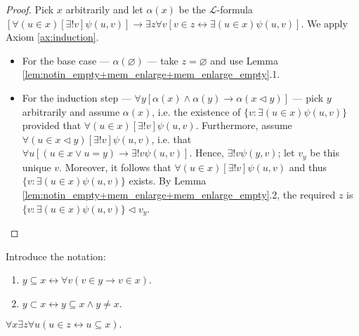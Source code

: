 \begin{proof}
    \leanok
    Pick $x$ arbitrarily and let $\alpha (x)$ be the $\mathcal{L}$-formula 
    $[\forall (u \in x) [\exists! v] \psi (u,v)]\rightarrow 
    \exists z \forall v [v\in z \leftrightarrow \exists(u \in x) \psi (u,v)]$.
    We apply Axiom \ref{ax:induction}.
    \begin{itemize}
        \item For the base case — $\alpha (\varnothing)$ — take $z=\varnothing$ and use 
        Lemma \ref{lem:notin_empty+mem_enlarge+mem_enlarge_empty}.1.
        \item For the induction step 
        — $\forall y[\alpha(x) \land \alpha(y) \rightarrow \alpha(x \lhd y)]$ — 
        pick $y$ arbitrarily and assume $\alpha(x)$, i.e. the existence of 
        $\{v : \exists (u\in x)\psi(u,v)\}$ provided that 
        $\forall (u \in x) [\exists! v] \psi (u,v)$.
        Furthermore, assume $\forall (u \in x \lhd y) [\exists! v] \psi (u,v)$, 
        i.e. that $\forall u [(u \in x \lor u = y) \rightarrow \exists! v \psi (u,v)]$.
        Hence, $\exists! v \psi (y,v)$; let $v_y$ be this unique $v$. 
        Moreover, it follows that $\forall (u \in x) [\exists! v] \psi (u,v)$ and 
        thus $\{v : \exists (u\in x)\psi(u,v)\}$ exists.
        By Lemma \ref{lem:notin_empty+mem_enlarge+mem_enlarge_empty}.2, 
        the required $z$ is $\{v : \exists (u\in x)\psi(u,v)\} \lhd v_y$.
    \end{itemize}
\end{proof}

\begin{definition}
    \label{def:Subset+SSubset}
    \leanok
    Introduce the notation:
    \begin{enumerate}
        \item $y \subseteq x \leftrightarrow \forall v (v\in y \rightarrow v \in x)$.
        \item $y \subset x \leftrightarrow y \subseteq x \land y \neq x$.
    \end{enumerate}  
\end{definition}

\begin{theorem}
    \label{thm:exists_powerset}
    \leanok
    $\forall x \exists z \forall u (u\in z \leftrightarrow u \subseteq x).$
\end{theorem}


